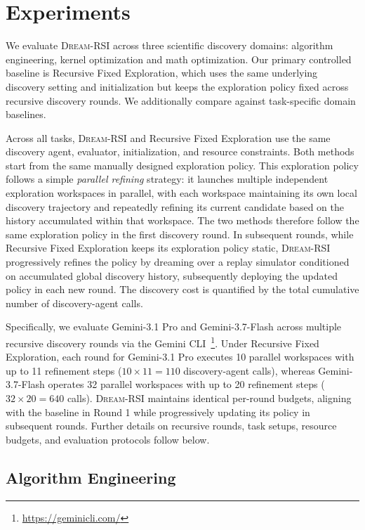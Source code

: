 \section{Experiments}
We evaluate \textsc{Dream-RSI} across three scientific discovery domains: algorithm engineering, kernel optimization and math optimization. Our primary controlled baseline is Recursive Fixed Exploration, which uses the same underlying discovery setting and initialization but keeps the exploration policy fixed across recursive discovery rounds. We additionally compare against task-specific domain baselines. 

Across all tasks, \textsc{Dream-RSI} and Recursive Fixed Exploration
use the same discovery agent, evaluator, initialization, and resource constraints.
Both methods start from the same manually designed exploration policy.
This exploration policy follows a simple \emph{parallel refining} strategy: it launches
multiple independent exploration workspaces in parallel, with each workspace
maintaining its own local discovery trajectory and repeatedly refining its
current candidate based on the history accumulated within that workspace.
The two methods therefore follow the same exploration policy in the first
discovery round. In subsequent rounds, while Recursive Fixed Exploration keeps its exploration policy static, \textsc{Dream-RSI} progressively refines the policy by dreaming over a replay simulator conditioned on accumulated global discovery history, subsequently deploying the updated policy in each new round. The discovery cost is quantified by the total cumulative number of discovery-agent calls.


Specifically, we evaluate Gemini-3.1 Pro and Gemini-3.7-Flash across multiple recursive discovery rounds via the Gemini CLI~\footnote{\url{https://geminicli.com/}}. Under Recursive Fixed Exploration, each round for Gemini-3.1 Pro executes 10 parallel workspaces with up to 11 refinement steps ($10 \times 11 = 110$ discovery-agent calls), whereas Gemini-3.7-Flash operates 32 parallel workspaces with up to 20 refinement steps ($32 \times 20 = 640$ calls). \textsc{Dream-RSI} maintains identical per-round budgets, aligning with the baseline in Round 1 while progressively updating its policy in subsequent rounds. Further details on recursive rounds, task setups, resource budgets, and evaluation protocols follow below.




\subsection{Algorithm Engineering}
\label{subsec:lasso}

